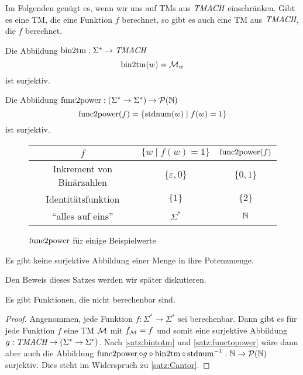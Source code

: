 \begin{Bemerkung}
 Im Folgenden genügt es, wenn wir uns auf \ac{TM}s aus $\textit{TMACH}$ einschränken.
 Gibt es eine \ac{TM}, die eine Funktion $f$ berechnet, so gibt es auch eine \ac{TM} aus $\textit{TMACH}$, die $f$ berechnet.
\end{Bemerkung}


\begin{lemma}\label{satz:bintotm}
 Die Abbildung $\operatorname{bin2tm}: \Sigma^*\rightarrow \textit{TMACH}$ 
 $$ \operatorname{bin2tm}(w)=\mathcal{M}_w$$
ist surjektiv.
\end{lemma}

\begin{lemma}\label{satz:functopower}
Die Abbildung $\operatorname{func2power}:(\Sigma^*\rightarrow\Sigma^*)\rightarrow \mathcal{P}(\mathbb{N})$
$$\operatorname{func2power}(f)=\{\operatorname{stdnum}(w)\mid f(w)=1\}$$
ist surjektiv.
\end{lemma}

 \begin{figure}[H]\centering
    \begin{tabular}{ccc}
    $f$ & $\{w\mid f(w)=1\}$ & $\operatorname{func2power}(f)$\\ \hline
    Inkrement von Binärzahlen & $\{\varepsilon, 0\}$ & $\{0,1\}$\\
    Identitätsfunktion & $\{1\}$ & $\{2\}$\\
    "`alles auf eins"' & $\Sigma^*$ & $\mathbb{N}$
    \end{tabular}

	\caption{$\operatorname{func2power}$ für einige Beispielwerte}
\end{figure}


\begin{Satz}[Cantor]\label{satz:Cantor}
Es gibt keine surjektive Abbildung einer Menge in ihre Potenzmenge.
\end{Satz}
Den Beweis dieses Satzes werden wir später diskutieren.

\begin{Satz}\label{satz:nichtBerechenbar}
 Es gibt Funktionen, die nicht berechenbar sind.
\end{Satz}
\begin{proof}
 Angenommen, jede Funktion $f:\Sigma^*\rightarrow\Sigma^*$ sei berechenbar.
 Dann gibt es für jede Funktion $f$ eine \ac{TM} $\mathcal{M}$ mit $f_{\mathcal{M}}=f$ und somit eine surjektive Abbildung $g:\textit{TMACH}\rightarrow(\Sigma^*\rightarrow\Sigma^*)$.
 Nach \autoref{satz:bintotm} und \autoref{satz:functopower} wäre dann aber auch die Abbildung $\operatorname{func2power}\circ g \circ\operatorname{bin2tm}\circ \operatorname{stdnum}^{-1}:\mathbb{N}\rightarrow\mathcal{P}(\mathbb{N})$ surjektiv.
 Dies steht im Widerspruch zu \autoref{satz:Cantor}.
\end{proof}

